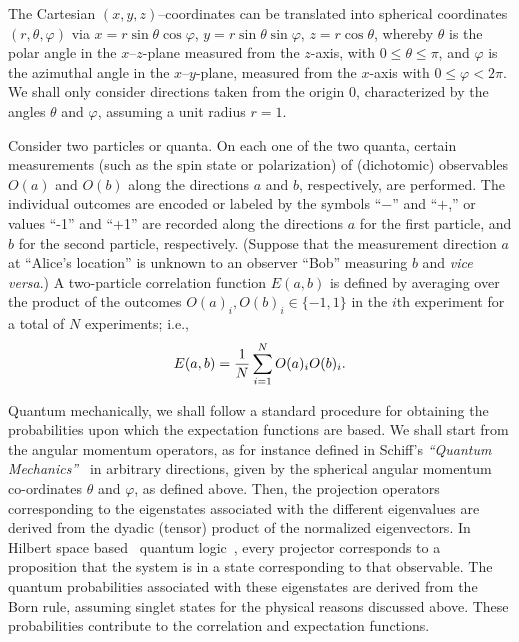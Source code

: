 \documentclass[pra,amsfonts,showpacs,showkeys,preprint]{revtex4}
\begin{document}
The Cartesian $(x  , y , z )$--coordinates can be translated into spherical coordinates
$(r, \theta ,\varphi )$ via
$x = r\sin \theta \cos \varphi$,
$y = r\sin \theta \sin \varphi$,
$z = r\cos \theta $,
whereby  $\theta$ is the polar angle in the $x$--$z$-plane measured
from the $z$-axis, with $0 \le \theta \le \pi$,
and $\varphi $ is  the azimuthal angle in the $x$--$y$-plane, measured
from the $x$-axis with $0 \le \varphi < 2 \pi$. We shall only consider directions taken from the origin $0$,
characterized by the angles
$\theta$ and $\varphi$, assuming a unit radius $r=1$.



Consider two particles or quanta. On each one of the two quanta, certain measurements
(such as the spin state or polarization) of
(dichotomic) observables
$O({ a})$ and
$O({ b})$
along the directions $a$ and $b$, respectively, are performed.
The individual outcomes are
encoded or labeled by the symbols ``$-$'' and  ``$+$,'' or values ``-1'' and ``+1'' are recorded along
the directions ${ a}$ for the first particle, and  ${ b}$ for the second particle, respectively.
(Suppose that the measurement direction ${a}$ at ``Alice's location''
is unknown to an observer ``Bob'' measuring ${ b}$ and {\it vice versa}.)
A two-particle correlation function $E(a,b )$
is defined by averaging over the product of the outcomes $O({ a})_i, O({ b} )_i\in \{-1,1\}$
in the $i$th experiment for a total of $N$ experiments; i.e.,
\begin{equation}
E(a,b )={1\over N}\sum_{i=1}^N O({ a})_i O({ b})_i.
\end{equation}


Quantum mechanically, we shall follow a standard procedure for obtaining the probabilities upon which the expectation functions are based.
We shall start from the angular momentum operators, as for instance defined in Schiff's {\em ``Quantum Mechanics''}~\cite[Chap.~VI, Sec.24]{schiff-55}
in arbitrary directions, given by the spherical angular momentum co-ordinates $\theta$ and $\varphi$, as defined above.
Then, the projection operators corresponding to the eigenstates associated with the different eigenvalues are derived
from the dyadic (tensor) product of the normalized eigenvectors.
In Hilbert space based~\cite{v-neumann-49} quantum logic~\cite{birkhoff-36}, every projector corresponds to
a proposition that the system is in a state corresponding to that observable.
The quantum probabilities associated with these eigenstates are derived from the Born rule, assuming singlet states for the physical reasons discussed above.
These probabilities contribute to the correlation and expectation functions.
\end{document}
